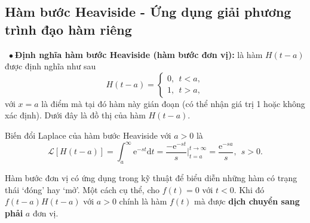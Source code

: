 \documentclass[10pt, a4paper]{article}
\begin{document}
	\subsection{Hàm bước Heaviside - Ứng dụng giải phương trình đạo hàm riêng}
	\quad\,\,\,$\bullet~$\textbf{Định nghĩa hàm bước Heaviside (hàm bước đơn vị):} là hàm $H(t-a)$ được định nghĩa như sau $$H(t-a)=\begin{cases}
		0,~~t<a,\\
		1,~~t>a,
	\end{cases}$$
	với $x=a$ là điểm mà tại đó hàm này gián đoạn (có thể nhận giá trị 1 hoặc không xác định). Dưới đây là đồ thị của hàm $H(t-a)$.
	\begin{center}
	\end{center}
	
	Biến đổi Laplace của hàm bước Heaviside với $a>0$ là $$\mathcal L[H(t-a)]=\int_a^\infty\mathrm e^{-st}\mathrm dt=\frac{-\mathrm e^{-st}}{s}\Bigg|_{t=a}^{t\to\infty}=\frac{\mathrm e^{-sa}}{s},~~s>0.$$
	
	Hàm bước đơn vị có ứng dụng trong kỹ thuật để biểu diễn những hàm có trạng thái ‘đóng’ hay ‘mở’. Một cách cụ thể, cho $f(t)=0$ với $t<0$. Khi đó $f(t-a)H(t-a)$ với $a>0$ chính là hàm $f(t)$ mà được \textbf{\color{red}dịch chuyển sang phải} $a$ đơn vị.\\
	
\end{document}
